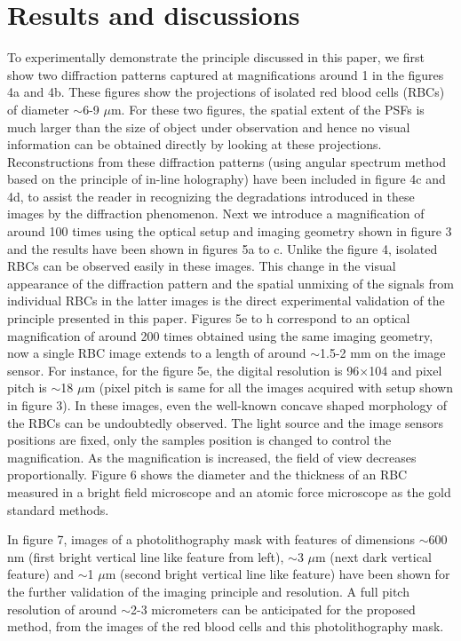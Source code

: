 \documentclass[journal]{IEEEtran}
\begin{document}
\section{Results and discussions}
To experimentally demonstrate the principle discussed in this paper, we first show two diffraction patterns captured at magnifications around 1 in the figures 4a and 4b. These figures show the projections of isolated red blood cells (RBCs) of diameter $\sim$6-9 $\mu$m. For these two figures, the spatial extent of the PSFs is much larger than the size of object under observation and hence no visual information can be obtained directly by looking at these projections. Reconstructions from these diffraction patterns (using angular spectrum method \cite{matsushima2009band} based on the principle of in-line holography) have been included in figure 4c and 4d, to assist the reader in recognizing the degradations introduced in these images by the diffraction phenomenon. Next we introduce a magnification of around 100 times using the optical setup and imaging geometry shown in figure 3 and the results have been shown in figures 5a to c. Unlike the figure 4, isolated RBCs can be observed easily in these images. This change in the visual appearance of the diffraction pattern and the spatial unmixing of the signals from individual RBCs in the latter images is the direct experimental validation of the principle presented in this paper. Figures 5e to h correspond to an optical magnification of around 200 times obtained using the same imaging geometry, now a single RBC image extends to a length of around $\sim$1.5-2 mm on the image sensor. For instance, for the figure 5e, the digital resolution is 96$\times$104 and pixel pitch is $\sim$18 $\mu$m (pixel pitch is same for all the images acquired with setup shown in figure 3). In these images, even the well-known concave shaped morphology of the RBCs \cite{merola2017tomographic} can be undoubtedly observed. The light source and the image sensor\textquotesingle s positions are fixed, only the sample\textquotesingle s position is changed to control the magnification. As the magnification is increased, the field of view decreases proportionally. Figure 6 shows the diameter and the thickness of an RBC measured in a bright field microscope and an atomic force microscope as the gold standard methods. 

In figure 7, images of a photolithography mask with features of dimensions $\sim$600 nm (first bright vertical line like feature from left), $\sim$3 $\mu$m (next dark vertical feature) and $\sim$1 $\mu$m (second bright vertical line like feature) have been shown for the further validation of the imaging principle and resolution. A full pitch resolution of around $\sim$2-3 micrometers can be anticipated for the proposed method, from the images of the red blood cells and this photolithography mask.
\end{document}
